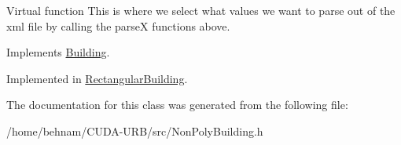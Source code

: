 Virtual function This is where we select what values we want to parse out of the xml file by calling the parseX functions above. 

Implements \hyperlink{classBuilding_a7782e7933a009fcfee4d186e62d34b43}{Building}.



Implemented in \hyperlink{classRectangularBuilding_adbc6b832c817fc06f9bc2e51561a7e81}{Rectangular\+Building}.



The documentation for this class was generated from the following file\+:\begin{DoxyCompactItemize}
\item 
/home/behnam/\+C\+U\+D\+A-\/\+U\+R\+B/src/Non\+Poly\+Building.\+h\end{DoxyCompactItemize}

